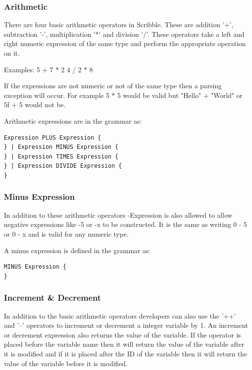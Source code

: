 \documentclass[]{final_report}
\begin{document}
\subsubsection{Arithmetic}

There are four basic arithmetic operators in Scribble. These are addition '+', subtraction '-', multiplication '*' and division '/'. These operators take a left and right numeric expression of the same type and perform the appropriate operation on it.

Examples: 
5 + 7 * 2
4 / 2 * 8

If the expressions are not numeric or not of the same type then a parsing exception will occur. For example 5 * 5 would be valid but "Hello" + "World" or 5f + 5 would not be.

Arithmetic expressions are in the grammar as:
\begin{verbatim}
Expression PLUS Expression {
} | Expression MINUS Expression {
} | Expression TIMES Expression {
} | Expression DIVIDE Expression {
}
\end{verbatim}

\subsubsection{Minus Expression}

In addition to these arithmetic operators -Expression is also allowed to allow negative expressions like -5 or -x to be constructed. It is the same as writing 0 - 5 or 0 - x and is valid for any numeric type. 

A minus expression is defined in the grammar as:

\begin{verbatim}
MINUS Expression {
}
\end{verbatim}

\subsubsection{Increment \& Decrement}

In addition to the basic arithmetic operators developers can also use the '++' and '--' operators to increment or decrement a integer variable by 1. An increment or decrement expression also returns the value of the variable. If the operator is placed before the variable name then it will return the value of the variable after it is modified and if it is placed after the ID of the variable then it will return the value of the variable before it is modified.
\end{document}

